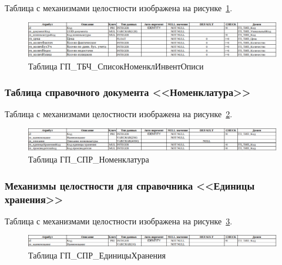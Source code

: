 Таблица с механизмами целостности изображена на рисунке~\ref{fig:Logic_DE_TAB_NomenclatureInventList}.

\begin{figure}[!h]
    \centering

    \includegraphics[width=18cm]
    {assets/database/Types/ГП_ТБЧ_СписокНоменклИнвентОписи.png}

    \caption{Таблица ГП\_ТБЧ\_СписокНоменклИнвентОписи}

    \label{fig:Logic_DE_TAB_NomenclatureInventList}
\end{figure}


\subsubsection*{Таблица справочного документа <<Номенклатура>>}

Таблица с механизмами целостности изображена на рисунке~\ref{fig:Logic_DE_CTL_Nomenclatures}.

\begin{figure}[!h]
    \centering

    \includegraphics[width=18cm]
    {assets/database/Types/ГП_СПР_Номенклатура.png}

    \caption{Таблица ГП\_СПР\_Номенклатура}

    \label{fig:Logic_DE_CTL_Nomenclatures}
\end{figure}


\subsubsection*{Механизмы целостности для справочника <<Единицы хранения>>}

Таблица с механизмами целостности изображена на рисунке~\ref{fig:Logic_DE_CTL_StorageUnits}.

\begin{figure}[!h]
    \centering

    \includegraphics[width=18cm]
    {assets/database/Types/ГП_СПР_ЕдиницыХранения.png}

    \caption{Таблица ГП\_СПР\_ЕдиницыХранения}

    \label{fig:Logic_DE_CTL_StorageUnits}
\end{figure}

